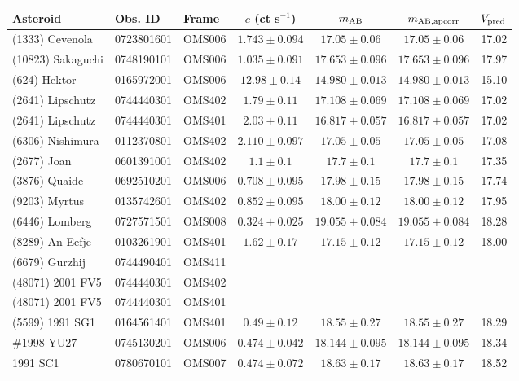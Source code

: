 \begin{table}[t]
\centering
\scriptsize
\setlength{\tabcolsep}{3pt}
\renewcommand{\arraystretch}{1.03}
\begin{tabular}{lllcccc}
Asteroid & Obs. ID & Frame & $c$ (ct s$^{-1}$) & $m_{\rm AB}$ & $m_{\rm AB,apcorr}$ & $V_{\rm pred}$ \\
\midrule
(1333) Cevenola & 0723801601 & OMS006 & $1.743 \pm 0.094$ & $17.05 \pm 0.06$ & $17.05 \pm 0.06$ & 17.02 \\
(10823) Sakaguchi & 0748190101 & OMS006 & $1.035 \pm 0.091$ & $17.653 \pm 0.096$ & $17.653 \pm 0.096$ & 17.97 \\
(624) Hektor & 0165972001 & OMS006 & $12.98 \pm 0.14$ & $14.980 \pm 0.013$ & $14.980 \pm 0.013$ & 15.10 \\
(2641) Lipschutz & 0744440301 & OMS402 & $1.79 \pm 0.11$ & $17.108 \pm 0.069$ & $17.108 \pm 0.069$ & 17.02 \\
(2641) Lipschutz & 0744440301 & OMS401 & $2.03 \pm 0.11$ & $16.817 \pm 0.057$ & $16.817 \pm 0.057$ & 17.02 \\
(6306) Nishimura & 0112370801 & OMS402 & $2.110 \pm 0.097$ & $17.05 \pm 0.05$ & $17.05 \pm 0.05$ & 17.08 \\
(2677) Joan & 0601391001 & OMS402 & $1.1 \pm 0.1$ & $17.7 \pm 0.1$ & $17.7 \pm 0.1$ & 17.35 \\
(3876) Quaide & 0692510201 & OMS006 & $0.708 \pm 0.095$ & $17.98 \pm 0.15$ & $17.98 \pm 0.15$ & 17.74 \\
(9203) Myrtus & 0135742601 & OMS402 & $0.852 \pm 0.095$ & $18.00 \pm 0.12$ & $18.00 \pm 0.12$ & 17.95 \\
(6446) Lomberg & 0727571501 & OMS008 & $0.324 \pm 0.025$ & $19.055 \pm 0.084$ & $19.055 \pm 0.084$ & 18.28 \\
(8289) An-Eefje & 0103261901 & OMS401 & $1.62 \pm 0.17$ & $17.15 \pm 0.12$ & $17.15 \pm 0.12$ & 18.00 \\
(6679) Gurzhij & 0744490401 & OMS411 &  &  &  &  \\
(48071) 2001 FV5 & 0744440301 & OMS402 &  &  &  &  \\
(48071) 2001 FV5 & 0744440301 & OMS401 &  &  &  &  \\
(5599) 1991 SG1 & 0164561401 & OMS401 & $0.49 \pm 0.12$ & $18.55 \pm 0.27$ & $18.55 \pm 0.27$ & 18.29 \\
\#1998 YU27 & 0745130201 & OMS006 & $0.474 \pm 0.042$ & $18.144 \pm 0.095$ & $18.144 \pm 0.095$ & 18.34 \\
1991 SC1 & 0780670101 & OMS007 & $0.474 \pm 0.072$ & $18.63 \pm 0.17$ & $18.63 \pm 0.17$ & 18.52 \\

\end{tabular}
\end{table}
